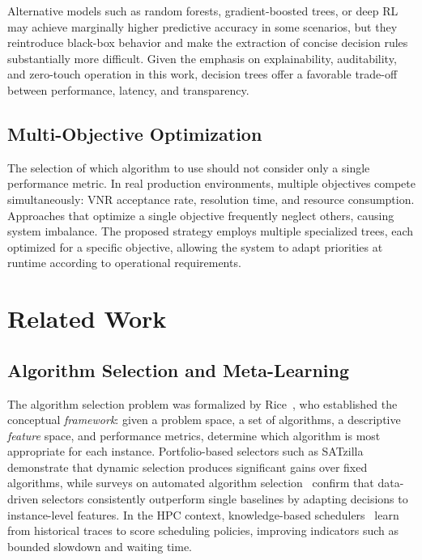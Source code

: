 \documentclass[a4paper,twoside]{article}
\begin{document}
Alternative models such as random forests, gradient-boosted trees, or deep RL may achieve marginally higher predictive accuracy in some scenarios, but they reintroduce black-box behavior and make the extraction of concise decision rules substantially more difficult. Given the emphasis on explainability, auditability, and zero-touch operation in this work, decision trees offer a favorable trade-off between performance, latency, and transparency.

\subsection{Multi-Objective Optimization}
\label{subsec:multiobj}

The selection of which algorithm to use should not consider only a single performance metric. In real production environments, multiple objectives compete simultaneously: VNR acceptance rate, resolution time, and resource consumption. Approaches that optimize a single objective frequently neglect others, causing system imbalance. The proposed strategy employs multiple specialized trees, each optimized for a specific objective, allowing the system to adapt priorities at runtime according to operational requirements.

\section{Related Work}
\label{sec:RelatedWork}

\subsection{Algorithm Selection and Meta-Learning}
\label{subsec:alg-selection}

The algorithm selection problem was formalized by Rice~\cite{rice1976algorithm}, who established the conceptual \textit{framework}: given a problem space, a set of algorithms, a descriptive \textit{feature} space, and performance metrics, determine which algorithm is most appropriate for each instance.
Portfolio-based selectors such as SATzilla~\cite{xu2012satzilla} demonstrate that dynamic selection produces significant gains over fixed algorithms, while surveys on automated algorithm selection~\cite{kerschke2019comprehensive} confirm that data-driven selectors consistently outperform single baselines by adapting decisions to instance-level features.
In the HPC context, knowledge-based schedulers~\cite{koslowski2025knowledge-based} learn from historical traces to score scheduling policies, improving indicators such as bounded slowdown and waiting time.
\end{document}

